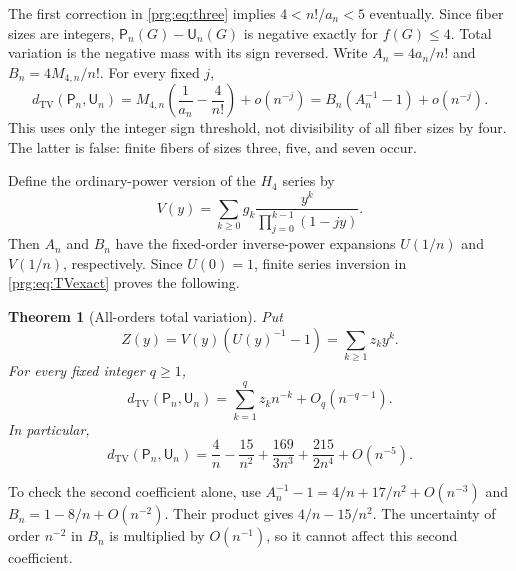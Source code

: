 \documentclass[11pt,letterpaper]{article}
\numberwithin{equation}{section}
\newtheorem{theorem}{Theorem}[section]
\theoremstyle{definition}\newtheorem{definition}[theorem]{Definition}
\theoremstyle{remark}\newtheorem{remark}[theorem]{Remark}
\DeclareMathOperator{\TV}{TV}
\begin{document}
The first correction in \eqref{prg:eq:three} implies
$4<n!/a_n<5$ eventually. Since fiber sizes are integers,
$\mathsf P_n(G)-\mathsf U_n(G)$ is negative exactly for $f(G)\leq4$.
Total variation is the negative mass with its sign reversed.
Write $A_n=4a_n/n!$ and $B_n=4M_{4,n}/n!$. For every fixed $j$,
\begin{equation}\label{prg:eq:TVexact}
 d_{\TV}(\mathsf P_n,\mathsf U_n)
 =M_{4,n}\left(\frac1{a_n}-\frac4{n!}\right)+o(n^{-j})
 =B_n(A_n^{-1}-1)+o(n^{-j}).
\end{equation}
This uses only the integer sign threshold, not divisibility of all
fiber sizes by four. The latter is false: finite fibers of sizes
three, five, and seven occur.

Define the ordinary-power version of the $H_4$ series by
\begin{equation}\label{prg:eq:V}
 V(y)=\sum_{k\geq0}g_k\frac{y^k}{\prod_{j=0}^{k-1}(1-jy)}.
\end{equation}
Then $A_n$ and $B_n$ have the fixed-order inverse-power expansions
$U(1/n)$ and $V(1/n)$, respectively. Since $U(0)=1$, finite series
inversion in \eqref{prg:eq:TVexact} proves the following.

\begin{theorem}[All-orders total variation]\label{prg:thm:tv}
Put
\begin{equation}\label{prg:eq:TVseries}
 Z(y)=V(y)(U(y)^{-1}-1)=\sum_{k\geq1}z_ky^k.
\end{equation}
For every fixed integer $q\geq1$,
\begin{equation}\label{prg:eq:TVall}
 d_{\TV}(\mathsf P_n,\mathsf U_n)
       =\sum_{k=1}^{q}z_kn^{-k}+O_q(n^{-q-1}).
\end{equation}
In particular,
\[
 d_{\TV}(\mathsf P_n,\mathsf U_n)=\frac4n-\frac{15}{n^2}
           +\frac{169}{3n^3}+\frac{215}{2n^4}+O(n^{-5}).
\]
\end{theorem}

To check the second coefficient alone, use
$A_n^{-1}-1=4/n+17/n^2+O(n^{-3})$ and
$B_n=1-8/n+O(n^{-2})$. Their product gives $4/n-15/n^2$.
The uncertainty of order $n^{-2}$ in $B_n$ is multiplied by
$O(n^{-1})$, so it cannot affect this second coefficient.
\end{document}

